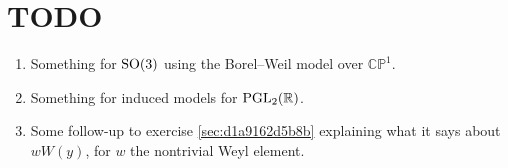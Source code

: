 \documentclass[reqno]{amsart} 
\numberwithin{equation}{section}
\begin{document}
\section{TODO}

\begin{enumerate}
\item Something for $\operatorname{SO}(3)$ using the Borel--Weil model over $\mathbb{C} \mathbb{P}^1$. 
\item Something for induced models for $\operatorname{PGL}_2(\mathbb{R})$.
\item Some follow-up to exercise \ref{sec:d1a9162d5b8b} explaining what it says about $w W(y)$, for $w$ the nontrivial Weyl element.
\end{enumerate}



{} 
\end{document}
